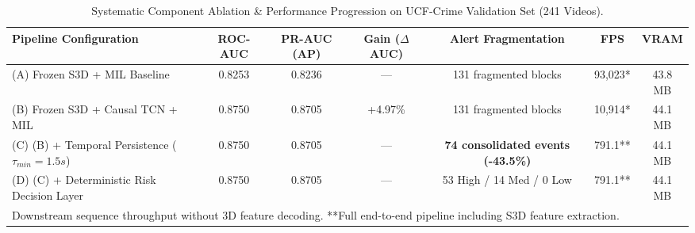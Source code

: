 \begin{table}[t]
\centering
\caption{Systematic Component Ablation & Performance Progression on UCF-Crime Validation Set (241 Videos).}
\label{tab:system_ablation}
\begin{tabular}{lcccccc}
\hline
\textbf{Pipeline Configuration} & \textbf{ROC-AUC} & \textbf{PR-AUC (AP)} & \textbf{Gain ($\Delta$AUC)} & \textbf{Alert Fragmentation} & \textbf{FPS} & \textbf{VRAM} \\
\hline
(A) Frozen S3D + MIL Baseline & 0.8253 & 0.8236 & --- & 131 fragmented blocks & 93,023* & 43.8 MB \\
(B) Frozen S3D + Causal TCN + MIL & 0.8750 & 0.8705 & +4.97\% & 131 fragmented blocks & 10,914* & 44.1 MB \\
(C) (B) + Temporal Persistence ($\tau_{min}=1.5s$) & 0.8750 & 0.8705 & --- & \textbf{74 consolidated events (-43.5\%)} & 791.1** & 44.1 MB \\
(D) (C) + Deterministic Risk Decision Layer & 0.8750 & 0.8705 & --- & 53 High / 14 Med / 0 Low & 791.1** & 44.1 MB \\
\hline
\multicolumn{7}{l}{\footnotesize *Downstream sequence throughput without 3D feature decoding. **Full end-to-end pipeline including S3D feature extraction.}
\end{tabular}
\end{table}
